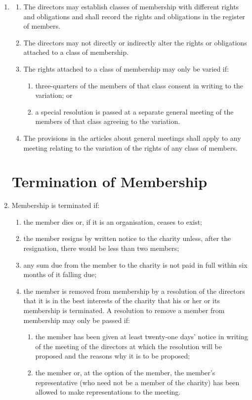 \begin{enumerate}
\item
  \label{cls:members}
  \begin{enumerate}
  \item
    The directors may establish classes of membership with different
    rights and obligations and shall record the rights and obligations
    in the register of members.
  \item
    The directors may not directly or indirectly alter the rights or
    obligations attached to a class of membership.
  \item
    The rights attached to a class of membership may only be varied if:
    \begin{enumerate}
    \item
      three-quarters of the members of that class consent in writing to
      the variation; or
    \item
      a special resolution is passed at a separate general meeting of the
      members of that class agreeing to the variation.
    \end{enumerate}
  \item
    The provisions in the articles about general meetings shall apply
    to any meeting relating to the variation of the rights of any class
    of members.
  \end{enumerate}

\section{Termination of Membership}

\item
  Membership is terminated if:
  \begin{enumerate}
  \item
    the member dies or, if it is an organisation, ceases to exist;
  \item
    the member resigns by written notice to the charity unless, after
    the resignation, there would be less than two members;
  \item
    any sum due from the member to the charity is not paid in full
    within six months of it falling due;
  \item
    the member is removed from membership by a resolution of the
    directors that it is in the best interests of the charity that his
    or her or its membership is terminated. A resolution to remove a
    member from membership may only be passed if:
    \begin{enumerate}
    \item
      the member has been given at least twenty-one days' notice in
      writing of the meeting of the directors at which the resolution
      will be proposed and the reasons why it is to be proposed;
    \item
      the member or, at the option of the member, the member's
      representative (who need not be a member of the charity) has been
      allowed to make representations to the meeting.
    \end{enumerate}
  \end{enumerate}


\end{enumerate}
